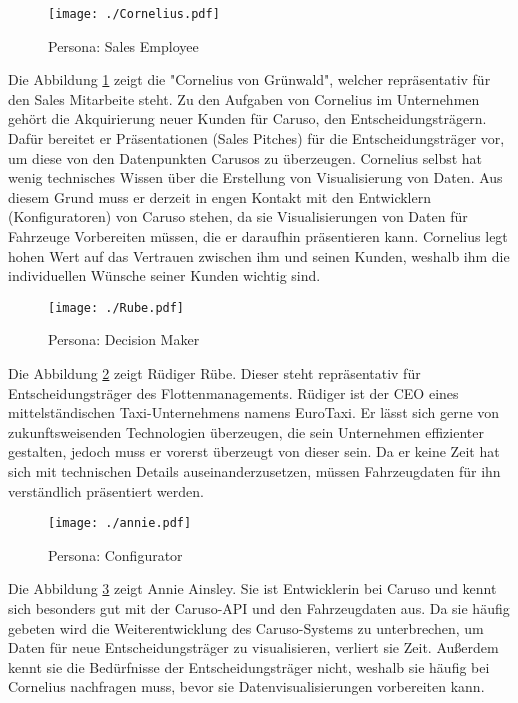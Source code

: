 \begin{figure}[ht]
  \centering
  \texttt{[image: ./Cornelius.pdf]}
  \caption{Persona: Sales Employee }
  \label{Persona:Cornelius}
\end{figure}
Die Abbildung \ref{Persona:Cornelius} zeigt die "Cornelius von Grünwald", welcher repräsentativ für den Sales Mitarbeite steht. Zu den Aufgaben von Cornelius im Unternehmen gehört die Akquirierung neuer Kunden für Caruso, den Entscheidungsträgern. Dafür bereitet er Präsentationen (Sales Pitches) für die Entscheidungsträger vor, um diese von den Datenpunkten Carusos zu überzeugen. Cornelius selbst hat wenig technisches Wissen über die Erstellung von Visualisierung von Daten. Aus diesem Grund muss er derzeit in engen Kontakt mit den Entwicklern (Konfiguratoren) von Caruso stehen, da sie Visualisierungen von Daten für Fahrzeuge Vorbereiten müssen, die er daraufhin präsentieren kann. Cornelius legt hohen Wert auf das Vertrauen zwischen ihm und seinen Kunden, weshalb ihm die individuellen Wünsche seiner Kunden wichtig sind.

\begin{figure}[ht]
  \centering
  \texttt{[image: ./Rube.pdf]}
  \caption{Persona: Decision Maker}
  \label{Persona:Rube}
\end{figure}
Die Abbildung \ref{Persona:Rube} zeigt Rüdiger Rübe. Dieser steht repräsentativ für Entscheidungsträger des Flottenmanagements. Rüdiger ist der CEO eines mittelständischen Taxi-Unternehmens namens EuroTaxi. Er lässt sich gerne von zukunftsweisenden Technologien überzeugen, die sein Unternehmen effizienter gestalten, jedoch muss er vorerst überzeugt von dieser sein. Da er keine Zeit hat sich mit technischen Details auseinanderzusetzen, müssen Fahrzeugdaten für ihn verständlich präsentiert werden. 

\begin{figure}[ht]
  \centering
  \texttt{[image: ./annie.pdf]}
  \caption{Persona: Configurator}
  \label{Persona:Annie}
\end{figure}
Die Abbildung \ref{Persona:Annie} zeigt Annie Ainsley. Sie ist Entwicklerin bei Caruso und kennt sich besonders gut mit der Caruso-API und den Fahrzeugdaten aus. Da sie häufig gebeten wird die Weiterentwicklung des Caruso-Systems zu unterbrechen, um Daten für neue Entscheidungsträger zu visualisieren, verliert sie Zeit. Außerdem kennt sie die Bedürfnisse der Entscheidungsträger nicht, weshalb sie häufig bei Cornelius nachfragen muss, bevor sie Datenvisualisierungen vorbereiten kann.
